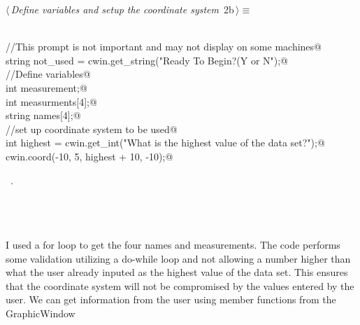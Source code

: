 \documentclass{article}
\begin{document}
\begin{flushleft} \small
\begin{minipage}{\linewidth}\label{scrap2}\raggedright\small
{} $\langle\,${\it Define variables and setup the coordinate system}\nobreak\ {\footnotesize {2b}}$\,\rangle\equiv$
\vspace{-1ex}
\begin{list}{}{} \item
\mbox{}\verb@@\\
\mbox{}\verb@        //This prompt is not important and may not display on some machines@\\
\mbox{}\verb@        string not_used = cwin.get_string("Ready To Begin?(Y or N");@\\
\mbox{}\verb@        //Define variables@\\
\mbox{}\verb@        int measurement;@\\
\mbox{}\verb@        int measurments[4];@\\
\mbox{}\verb@        string names[4];@\\
\mbox{}\verb@        //set up coordinate system to be used@\\
\mbox{}\verb@        int highest = cwin.get_int("What is the highest value of the data set?");@\\
\mbox{}\verb@        cwin.coord(-10, 5, highest + 10, -10);@\\
\mbox{}\verb@@{\NWsep}
\end{list}
\vspace{-1.5ex}
\footnotesize
\begin{list}{}{\setlength{\itemsep}{-\parsep}\setlength{\itemindent}{-\leftmargin}}
\item \NWtxtMacroRefIn\ .

\item{}
\end{list}
\end{minipage}\vspace{4ex}
\end{flushleft}
\\
\\
\\
I used a for loop to get the four names and measurements. The code
performs some validation utilizing a do-while loop and not allowing 
a number higher than what the user already inputed as the highest 
value of the data set. This ensures that the coordinate system will 
not be compromised by the values entered by the user. We can get 
information from the user using member functions from the GraphicWindow 
\end{document}
